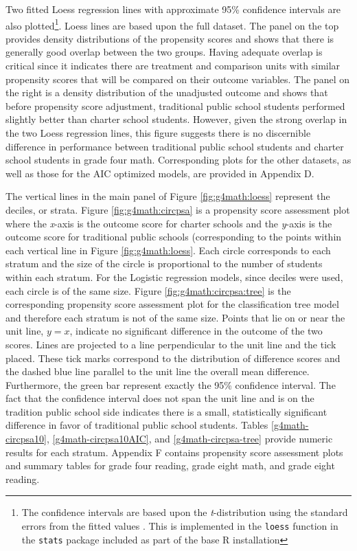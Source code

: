 \documentclass[letterpaper,12p,twoside]{article} %
\begin{document}

Two fitted Loess regression lines with approximate 95\% confidence intervals are also plotted\footnote{The confidence intervals are based upon the \textit{t}-distribution using the standard errors from the fitted values \cite{Cleveland1992}. This is implemented in the \texttt{loess} function in the \texttt{stats} package included as part of the base R \cite{rdevelopment} installation}. Loess lines are based upon the full dataset. The panel on the top provides density distributions of the propensity scores and shows that there is generally good overlap between the two groups. Having adequate overlap is critical since it indicates there are treatment and comparison units with similar propensity scores that will be compared on their outcome variables. The panel on the right is a density distribution of the unadjusted outcome and shows that before propensity score adjustment, traditional public school students performed slightly better than charter school students. However, given the strong overlap in the two Loess regression lines, this figure suggests there is no discernible difference in performance between traditional public school students and charter school students in grade four math. Corresponding plots for the other datasets, as well as those for the AIC optimized models, are provided in Appendix D.

The vertical lines in the main panel of Figure \ref{fig:g4math:loess} represent the deciles, or strata. Figure \ref{fig:g4math:circpsa} is a propensity score assessment plot \cite{HelmreichPruzek2009} where the \textit{x}-axis is the outcome score for charter schools and the \textit{y}-axis is the outcome score for traditional public schools (corresponding to the points within each vertical line in Figure \ref{fig:g4math:loess}. Each circle corresponds to each stratum and the size of the circle is proportional to the number of students within each stratum. For the Logistic regression models, since deciles were used, each circle is of the same size. Figure \ref{fig:g4math:circpsa:tree} is the corresponding propensity score assessment plot for the classification tree model and therefore each stratum is not of the same size. Points that lie on or near the unit line, $y = x$, indicate no significant difference in the outcome of the two scores. Lines are projected to a line perpendicular to the unit line and the tick placed. These tick marks correspond to the distribution of difference scores and the dashed blue line parallel to the unit line the overall mean difference. Furthermore, the green bar represent exactly the 95\% confidence interval. The fact that the confidence interval does not span the unit line and is on the tradition public school side indicates there is a small, statistically significant difference in favor of traditional public school students. Tables \ref{g4math-circpsa10}, \ref{g4math-circpsa10AIC}, and \ref{g4math-circpsa-tree} provide numeric results for each stratum. Appendix F contains propensity score assessment plots and summary tables for grade four reading, grade eight math, and grade eight reading.
\end{document}
